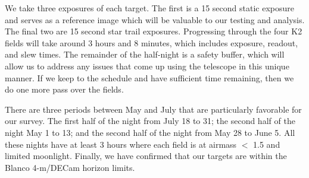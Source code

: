 \documentclass[11pt]{article}
\begin{document}
We take three exposures of each target. The first is a 15 second static exposure and serves as a reference image which will be valuable to our testing and analysis. The final two are 15 second star trail exposures. Progressing through the four K2 fields will take around 3 hours and 8 minutes, which includes exposure, readout, and slew times. The remainder of the half-night is a safety buffer, which will allow us to address any issues that come up using the telescope in this unique manner. If we keep to the schedule and have sufficient time remaining, then we do one more pass over the fields.

There are three periods between May and July that are particularly favorable for our survey. The first half of the night from July 18 to 31; the second half of the night May 1 to 13; and the second half of the night from May 28 to June 5. All these nights have at least 3 hours where each field is at airmass $<$ 1.5 and limited moonlight. Finally, we have confirmed that our targets are within the Blanco 4-m/DECam horizon limits.



\end{document}
